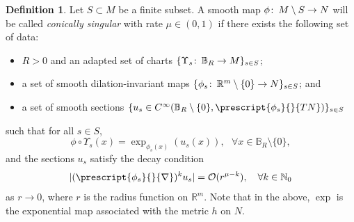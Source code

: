 \documentclass{article}
\numberwithin{equation}{section}        %
\theoremstyle{bfnote}
\theoremstyle{definition}
\newtheorem{Def}[thm]{Definition}           %
\theoremstyle{bfremark}
\newcommand{\col}{\colon \thinspace}        %
\newcommand{\N}{\mathbb{N}}                 %
\newcommand{\R}{\mathbb{R}}                 %
\newcommand{\Ball}{\mathbb{B}}              %
\begin{document}
\begin{Def}     \label{Def: Conically singular maps}
    Let $S \subset M$ be a finite subset. A smooth map $\phi \col M \setminus S \rightarrow N$ will be called \emph{conically singular} with rate $\mu \in (0,1)$ if there exists the following set of data:
    \begin{itemize}
        \item $R >0$ and an adapted set of charts $\{\Upsilon_s \col \Ball_R \to M\}_{s \in S}$;
        \item a set of smooth dilation-invariant maps $\{ \phi_s \col \R^m \setminus \{0\} \to N \}_{s \in S}$; and
        \item a set of smooth sections $\{ u_s \in C^\infty(\Ball_R \setminus \{0\}, \prescript{\phi_s}{}{TN}) \}_{s \in S}$
    \end{itemize}
    such that for all $s \in S$, 
    \begin{equation*}
        \phi \circ \Upsilon_s(x) = \exp_{\phi_s(x)}(u_s(x)), ~~~  \forall x \in \Ball_R \setminus \{0\},
    \end{equation*}
    and the sections $u_s$ satisfy the decay condition
    \begin{equation*}
        |(\prescript{\phi_s}{}{\nabla})^k u_s | = \mathcal{O}(r^{\mu-k}), ~~~ \forall k \in \N_0
    \end{equation*}
    as $r \to 0$, where $r$ is the radius function on $\R^m$. Note that in the above, $\exp$ is the exponential map associated with the metric $h$ on $N$.
\end{Def}
\end{document}

